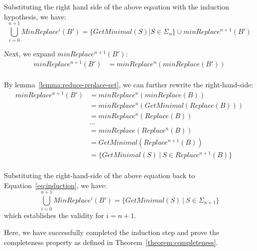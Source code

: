 Substituting the right hand side of the above eqaution with the induction hypothesis, 
we have:
\begin{equation}
    \label{eq:induction}
     \bigcup_{i=0}^{n+1}MinReplace^i(B') = \{ GetMinimal(S)  | S \in \Sigma_n \}
                                           \cup minReplace^{n+1}(B')
\end{equation}

Next, we expand $minReplace^{n+1}(B')$: 
\begin{align*}
    minReplace^{n+1}(B') & = minReplace^n(minReplace(B')) \\
\end{align*}

By lemma~\ref{lemma:reduce-replace-set}, we can further rewrite the right-hand-side: 
\begin{align*}
    minReplace^{n+1}(B') 
                    & = minReplace^n(minReplace(B)) \\
                    & = minReplace^n(GetMinimal(Replace(B))) \\
                    & = minReplace^n(Replace(B)) \\
                    & ... \\
                    & = minReplace(Replace^{n}(B)) \\
                    & = GetMinimal(Replace^{n+1}(B)) \\
                    & = \{ GetMinimal(S) ~|~ S \in Replace^{n+1}(B) \} \\
\end{align*}

Substituting the right-hand-side of the above equation back to Equation~\ref{eq:induction},
we have:
\[
    \bigcup_{i=0}^{n+1}MinReplace^i(B') = \{ GetMinimal(S) ~|~ S \in \Sigma_{n+1} \}
\]
which establishes the validity for $i=n+1$.

Here, we have successfully completed the induction step and prove the completeness property
as defined in Theorem~\ref{theorem:completeness}.